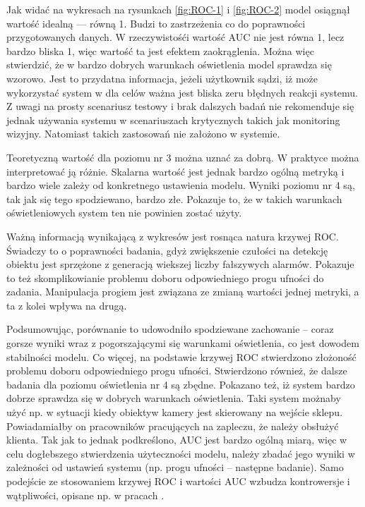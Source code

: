 Jak widać na wykresach na rysunkach \ref{fig:ROC-1} i \ref{fig:ROC-2} model osiągnął wartość idealną --- równą 1. Budzi to zastrzeżenia co do poprawności przygotowanych danych. W rzeczywistośći wartość AUC nie jest równa 1, lecz bardzo bliska 1, więc wartość ta jest efektem zaokrąglenia. Można więc stwierdzić, że w bardzo dobrych warunkach oświetlenia model sprawdza się wzorowo. Jest to przydatna informacja, jeżeli użytkownik sądzi, iż może wykorzystać system w dla celów ważna jest bliska zeru błędnych reakcji systemu. Z uwagi na prosty scenariusz testowy i brak dalszych badań nie rekomenduje się jednak używania systemu w scenariuszach krytycznych takich jak monitoring wizyjny. Natomiast takich zastosowań nie założono w systemie. 

Teoretyczną wartość dla poziomu nr 3 można uznać za dobrą. W praktyce można interpretować ją różnie. Skalarna wartość jest jednak bardzo ogólną metryką i bardzo wiele zależy od konkretnego ustawienia modelu. Wyniki poziomu nr 4 są, tak jak się tego spodziewano, bardzo złe. Pokazuje to, że w takich warunkach oświetleniowych system ten nie powinien zostać użyty. 

Ważną informacją wynikającą z wykresów jest rosnąca natura krzywej ROC. Świadczy to o poprawności badania, gdyż zwiększenie czułości na detekcję obiektu jest sprzężone z generacją wiekszej liczby fałszywych alarmów.
Pokazuje to też skomplikowianie problemu doboru odpowiedniego progu ufności do zadania. Manipulacja progiem jest związana ze zmianą wartości jednej metryki, a ta z kolei wpływa na drugą.

Podsumowując, porównanie to udowodniło spodziewane zachowanie -- coraz gorsze wyniki wraz z pogorszającymi się warunkami oświetlenia, co jest dowodem stabilności modelu. Co więcej, na podstawie krzywej ROC stwierdzono złożoność problemu doboru odpowiedniego progu ufności. Stwierdzono również, że dalsze badania dla poziomu oświetlenia nr 4 są zbędne. Pokazano też, iż system bardzo dobrze sprawdza się w dobrych warunkach oświetlenia. Taki system możnaby użyć  np. w sytuacji kiedy obiektyw kamery jest skierowany na wejście sklepu. Powiadamiałby on pracowników pracujących na zapleczu, że należy obsłużyć klienta. 
Tak jak to jednak podkreślono, AUC jest bardzo ogólną miarą, więc w celu dogłebszego stwierdzenia użyteczności modelu, należy zbadać jego wyniki w zależności od ustawień systemu (np. progu ufności -- następne badanie). Samo podejście ze stosowaniem krzywej ROC i wartości AUC wzbudza kontrowersje i wątpliwości, opisane np. w pracach \cite{AUC_critique1,AUC_critique2}.






